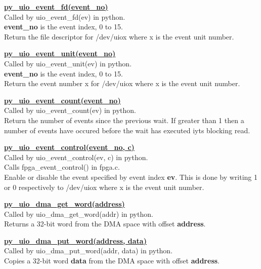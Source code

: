             \underline{{\bf py\_uio\_event\_fd(event\_no)}} \\

                Called by uio\_event\_fd(ev) in python.\\
                {\bf event\_no} is the event index, 0 to 15.\\
                Return the file descriptor for /dev/uiox where x is the event unit number.

            \underline{{\bf py\_uio\_event\_unit(event\_no)}} \\

                Called by uio\_event\_unit(ev) in python.\\
                {\bf event\_no} is the event index, 0 to 15.\\
                Return the event number x for /dev/uiox where x is the event unit number.

            \underline{{\bf py\_uio\_event\_count(event\_no)}} \\

                Called by uio\_event\_count(ev) in python.\\
                Return the number of events since the previous wait. If greater than 1 then
                a number of events have occured before the wait has executed iyts blocking read.

            \underline{{\bf py\_uio\_event\_control(event\_no, c)}} \\

                Called by uio\_event\_control(ev, c) in python.\\
                Calls fpga\_event\_control() in fpga.c.\\
                Enable or disable the event specified by event index {\bf ev}. This is done by
                writing 1 or 0 respectively to /dev/uiox where x is the event unit number.

            \underline{{\bf py\_uio\_dma\_get\_word(address)}} \\

                Called by uio\_dma\_get\_word(addr) in python.\\
                Returns a 32-bit word from the DMA space with offset {\bf address}.

            \underline{{\bf py\_uio\_dma\_put\_word(address, data)}} \\

                Called by uio\_dma\_put\_word(addr, data) in python.\\
                Copies a 32-bit word {\bf data} from the DMA space with offset {\bf address}.

